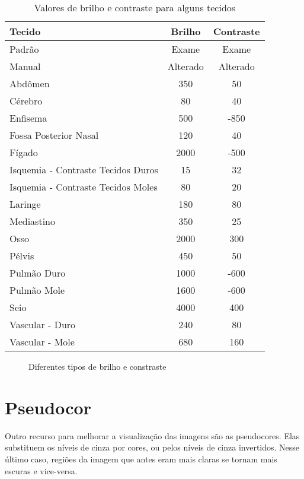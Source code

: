 \begin{table}[h]
\centering
\caption{Valores de brilho e contraste para alguns tecidos}
\begin{tabular}{lcc}\\
\hline %
Tecido & Brilho & Contraste\\
\hline
\hline
Padrão & Exame & Exame\\
Manual & Alterado & Alterado\\
Abdômen & 350 & 50 \\
Cérebro & 80 & 40\\
Enfisema & 500 & -850\\
Fossa Posterior Nasal & 120 & 40\\
Fígado & 2000 & -500\\
Isquemia - Contraste Tecidos Duros & 15 & 32\\
Isquemia - Contraste Tecidos Moles & 80 & 20\\
Laringe & 180 & 80\\
Mediastino & 350 & 25\\
Osso & 2000 & 300\\
Pélvis & 450 & 50\\
Pulmão Duro & 1000 & -600\\
Pulmão Mole & 1600 & -600\\
Seio & 4000 & 400\\
Vascular - Duro & 240 & 80\\
Vascular - Mole & 680 & 160\\
\hline
\end{tabular}
\label{tab:window_level}
\end{table} 

\begin{figure}
  \centering
  \caption{Diferentes tipos de brilho e constraste}
  \label{fig:two_window_level}
\end{figure}


\section{Pseudocor}

Outro recurso para melhorar a visualização das imagens são as pseudocores. Elas substituem os níveis
de cinza por cores, ou pelos níveis de cinza invertidos. Nesse último caso, regiões da imagem que
antes eram mais claras se tornam mais escuras e vice-versa.

